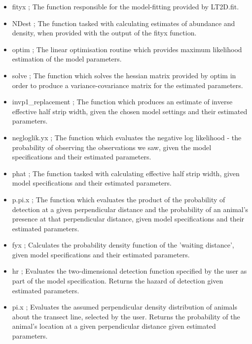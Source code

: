 \documentclass[11pt]{article}
\begin{document}
\begin{multicols}{2}
\begin{itemize}
\item fityx ; The function responsible for the model-fitting provided by LT2D.fit.

\item NDest ; The function tasked with calculating estimates of abundance and density, when provided with the output of the fityx function.

\item optim ; The linear optimisation routine which provides maximum likelihood estimation of the model parameters.

\item solve ; The function which solves the hessian matrix provided by optim in order to produce a variance-covariance matrix for the estimated parameters.

\item invp1\_replacement ; The function which produces an estimate of inverse effective half strip width, given the chosen model settings and their estimated parameters.

\item negloglik.yx ; The function which evaluates the negative log likelihood - the probability of observing the observations we saw, given the model specifications and their estimated parameters.

\item phat ; The function tasked with calculating effective half strip width, given model specifications and their estimated parameters.

\item p.pi.x ; The function which evaluates the product of the probability of detection at a given perpendicular distance and the probability of an animal's presence at that perpendicular distance, given model specifications and their estimated parameters.

\item fyx ; Calculates the probability density function of the 'waiting distance', given model specifications and their estimated parameters.

\item hr ; Evaluates the two-dimensional detection function specified by the user as part of the model specification. Returns the hazard of detection given estimated parameters.

\item pi.x ; Evaluates the assumed perpendicular density distribution of animals about the transect line, selected by the user. Returns the probability of the animal's location at a given perpendicular distance given estimated parameters.


\end{itemize}
\end{multicols}
\end{document}
